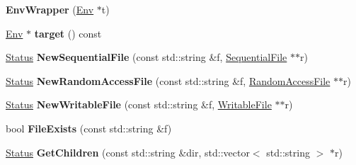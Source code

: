 \begin{DoxyCompactItemize}
\item 
\mbox{\label{classleveldb_1_1_env_wrapper_a724d3740db2663034c8974c0378e49cb}} 
{\bfseries Env\+Wrapper} (\mbox{\hyperlink{classleveldb_1_1_env}{Env}} $\ast$t)
\item 
\mbox{\label{classleveldb_1_1_env_wrapper_ac9bdbc7110de3bdbc42c04ca65f68de6}} 
\mbox{\hyperlink{classleveldb_1_1_env}{Env}} $\ast$ {\bfseries target} () const
\item 
\mbox{\label{classleveldb_1_1_env_wrapper_acd23f5803f7841cfcee9a29ffc1c5b04}} 
\mbox{\hyperlink{classleveldb_1_1_status}{Status}} {\bfseries New\+Sequential\+File} (const std\+::string \&f, \mbox{\hyperlink{classleveldb_1_1_sequential_file}{Sequential\+File}} $\ast$$\ast$r)
\item 
\mbox{\label{classleveldb_1_1_env_wrapper_ab8c78959e0d52f3c1beeeffc11ca0a34}} 
\mbox{\hyperlink{classleveldb_1_1_status}{Status}} {\bfseries New\+Random\+Access\+File} (const std\+::string \&f, \mbox{\hyperlink{classleveldb_1_1_random_access_file}{Random\+Access\+File}} $\ast$$\ast$r)
\item 
\mbox{\label{classleveldb_1_1_env_wrapper_a2d2b29a658e80c326ddaeb9c4d74c483}} 
\mbox{\hyperlink{classleveldb_1_1_status}{Status}} {\bfseries New\+Writable\+File} (const std\+::string \&f, \mbox{\hyperlink{classleveldb_1_1_writable_file}{Writable\+File}} $\ast$$\ast$r)
\item 
\mbox{\label{classleveldb_1_1_env_wrapper_ac72ceac6f4e2a6140e2835b2fa15f4df}} 
bool {\bfseries File\+Exists} (const std\+::string \&f)
\item 
\mbox{\label{classleveldb_1_1_env_wrapper_abb7c1fd7d91c80b6efcf9967154a18f3}} 
\mbox{\hyperlink{classleveldb_1_1_status}{Status}} {\bfseries Get\+Children} (const std\+::string \&dir, std\+::vector$<$ std\+::string $>$ $\ast$r)
\item 
\mbox{\label{classleveldb_1_1_env_wrapper_af99d37829c3806a0e05979f5a7eb35af}} 
$$
\end{DoxyCompactItemize}
